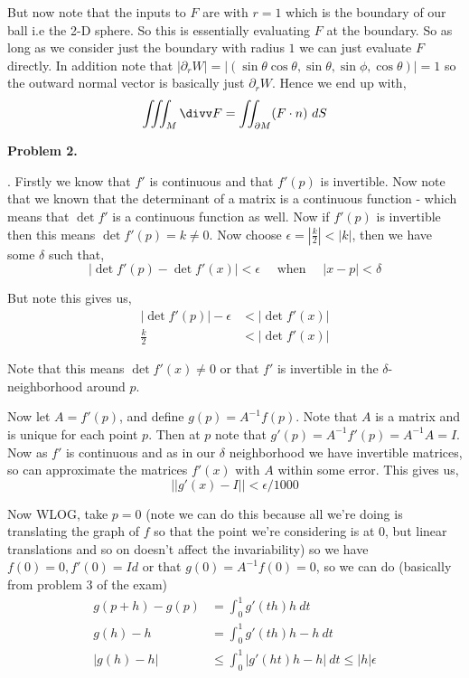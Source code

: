 \documentclass[a4paper]{article}
\begin{document}
But now note that the inputs to $F$ are with $r = 1$ which is the boundary of our ball i.e the 2-D sphere. So this is essentially evaluating $F$ at the boundary. So as long as we consider just the boundary with radius $1$ we can just evaluate $F$ directly. In addition note that $|\partial_r W| =\left | (\sin \theta \cos \theta, \sin \theta, \sin \phi, \cos \theta) \right |  = 1$ so the outward normal vector is basically just $\partial_r W$. Hence we end up with, 
\[
  \iiint_M \divv F = \iint_{\partial M} (F \cdot n) \ dS
\]

\vspace{1em}

\textbf{Problem 2.} 

\vspace{1em}

. Firstly we know that $f'$ is continuous and that $f'(p)$ is invertible. Now note that we known that the determinant of a matrix is a continuous function - which means that $\det f'$ is a continuous function as well. Now if $f'(p)$ is invertible then this means $\det f'(p) = k \ne 0$. Now choose $\epsilon = \left | \frac{k}{2} \right |< |k|$, then we have some $\delta$  such that, 
\[
  |\det f'(p) - \det f'(x)|< \epsilon \quad \text{ when }  \quad |x - p| < \delta
\]

But note this gives us, 
\begin{align*}
  |\det f'(p)|  - \epsilon&< |\det f'(x)|\\
  \frac{k}{2} &< |\det f'(x)|
\end{align*}


Note that this means $\det f'(x) \ne 0$ or that $f'$ is invertible in the $\delta$-neighborhood around $p$. 

\vspace{1em}

Now let $A = f'(p)$, and define $g(p) = A^{-1} f(p)$. Note that $A$ is a matrix and is unique for each point $p$. Then at $p$ note that $g'(p) = A^{-1} f'(p) = A^{-1}A = I$. Now as $f'$ is continuous and as in our $\delta$ neighborhood we have invertible matrices, so can approximate the matrices $f'(x)$ with $A$ within some error. This gives us, 
\[
  \left | \left | g'(x)  - I\right |\right | < \epsilon / 1000
\]

Now WLOG, take $p = 0$ (note we can do this because all we're doing is translating the graph of $f$ so that the point we're considering is at $0$, but linear translations and so on doesn't affect the invariability) so we have $f(0) = 0, f'(0) = Id$ or that $g(0) = A^{-1}f(0) = 0$, so we can do  (basically from problem 3 of the exam)
\begin{align*}
  g(p + h) - g(p) &= \int_{0}^{1} g'(th)h \ dt\\
            g(h) - h &= \int_{0}^{1}  g'(th)h- h \ dt\\
            |g(h) - h| &\le \int_{0}^{1}  |g'(ht) h - h | \ dt \le |h| \epsilon
\end{align*}
\end{document}
